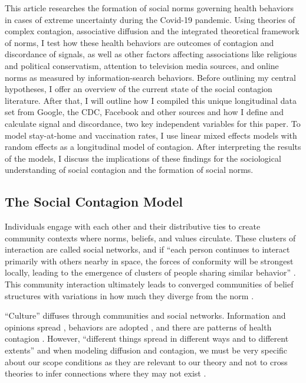 This article researches the formation of social norms governing health behaviors
in cases of extreme uncertainty during the Covid-19 pandemic. Using theories of complex
contagion, associative diffusion and the integrated theoretical framework of
norms, I test how these health behaviors are outcomes of contagion and
discordance of signals, as well as other factors affecting associations like
religious and political conservatism, attention to television media sources,
and online norms as measured by information-search behaviors. Before outlining
my central hypotheses, I offer an overview of the current state of the social
contagion literature. After that, I will outline how I compiled this unique
longitudinal data set from Google, the CDC, Facebook and other sources and how I
define and calculate signal and discordance, two key independent variables for
this paper. To model stay-at-home and vaccination rates, I use linear mixed effects
models with random effects as a longitudinal model of contagion. After
interpreting the results of the models, I discuss the implications of these
findings for the sociological understanding of social contagion and the
formation of social norms.

\hypertarget{the-social-contagion-model}{%
\subsection{The Social Contagion Model}\label{the-social-contagion-model}}

Individuals engage with each other and their distributive ties to create
community contexts where norms, beliefs, and values circulate. These clusters of
interaction are called social networks, and if ``each person continues to
interact primarily with others nearby in space, the forces of conformity will be
strongest locally, leading to the emergence of clusters of people sharing
similar behavior'' \citep{kitts_shi18}. This community
interaction ultimately leads to converged communities of belief structures with
variations in how much they diverge from the norm \citep{cullumCulturalEvolutionInterpersonal2007, lataneExperimentalEvidenceDynamic1996, okadaStructureCulturalRejection2017}.

``Culture'' diffuses through communities and social networks. Information and
opinions spread \citep{bond_etal12, fowler2010cooperative,klarEffectNetworkStructure2017}, behaviors are adopted \citep{aralExerciseContagionGlobal2017, centolaSpreadBehaviorOnline2010, centolaExperimentalStudyHomophily2011,christakis2008collective,rosenquist2010spread}, and there are patterns of health contagion \citep{cacioppo2009alone,christakisSpreadObesityLarge2007}. However,
``different things spread in different ways and to different extents''
\citep[p. 563]{christakisSocialContagionTheory2013} and when modeling diffusion and
contagion, we must be very specific about our scope conditions as they are
relevant to our theory and not to cross theories to infer connections where they
may not exist \citep{kitts_quintane20}.


